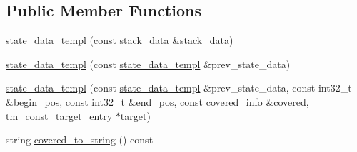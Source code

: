 \subsection*{Public Member Functions}
\begin{DoxyCompactItemize}
\item 
\hyperlink{structuva_1_1smt_1_1bpbd_1_1server_1_1decoder_1_1stack_1_1state__data__templ_ab1d11ad1ba4c89051ad0606b12130647}{state\+\_\+data\+\_\+templ} (const \hyperlink{structuva_1_1smt_1_1bpbd_1_1server_1_1decoder_1_1stack_1_1stack__data}{stack\+\_\+data} \&\hyperlink{structuva_1_1smt_1_1bpbd_1_1server_1_1decoder_1_1stack_1_1stack__data}{stack\+\_\+data})
\item 
\hyperlink{structuva_1_1smt_1_1bpbd_1_1server_1_1decoder_1_1stack_1_1state__data__templ_a527f2981ff129c1eb410753eba05373c}{state\+\_\+data\+\_\+templ} (const \hyperlink{structuva_1_1smt_1_1bpbd_1_1server_1_1decoder_1_1stack_1_1state__data__templ}{state\+\_\+data\+\_\+templ} \&prev\+\_\+state\+\_\+data)
\item 
\hyperlink{structuva_1_1smt_1_1bpbd_1_1server_1_1decoder_1_1stack_1_1state__data__templ_abd343797cdb4617615d32aabea25b743}{state\+\_\+data\+\_\+templ} (const \hyperlink{structuva_1_1smt_1_1bpbd_1_1server_1_1decoder_1_1stack_1_1state__data__templ}{state\+\_\+data\+\_\+templ} \&prev\+\_\+state\+\_\+data, const int32\+\_\+t \&begin\+\_\+pos, const int32\+\_\+t \&end\+\_\+pos, const \hyperlink{structuva_1_1smt_1_1bpbd_1_1server_1_1decoder_1_1stack_1_1state__data__templ_a1fca0516a4ceb05fe35ea64a0b354d8a}{covered\+\_\+info} \&covered, \hyperlink{namespaceuva_1_1smt_1_1bpbd_1_1server_1_1tm_1_1models_ae043b2a8672e39fe61239f7f1ece86ab}{tm\+\_\+const\+\_\+target\+\_\+entry} $\ast$target)
\item 
string \hyperlink{structuva_1_1smt_1_1bpbd_1_1server_1_1decoder_1_1stack_1_1state__data__templ_aec48f4018a792dc8acc14b44d768373c}{covered\+\_\+to\+\_\+string} () const 
\end{DoxyCompactItemize}

